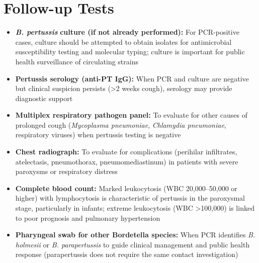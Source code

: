 \section*{Follow-up Tests}
\begin{itemize}
  \item \textit{\textbf{B. pertussis}} \textbf{culture (if not already performed):} For PCR-positive cases, culture should be attempted to obtain isolates for antimicrobial susceptibility testing and molecular typing; culture is important for public health surveillance of circulating strains
  \item \textbf{Pertussis serology (anti-PT IgG):} When PCR and culture are negative but clinical suspicion persists (>2 weeks cough), serology may provide diagnostic support
  \item \textbf{Multiplex respiratory pathogen panel:} To evaluate for other causes of prolonged cough (\textit{Mycoplasma pneumoniae}, \textit{Chlamydia pneumoniae}, respiratory viruses) when pertussis testing is negative
  \item \textbf{Chest radiograph:} To evaluate for complications (perihilar infiltrates, atelectasis, pneumothorax, pneumomediastinum) in patients with severe paroxysms or respiratory distress
  \item \textbf{Complete blood count:} Marked leukocytosis (WBC 20,000--50,000 or higher) with lymphocytosis is characteristic of pertussis in the paroxysmal stage, particularly in infants; extreme leukocytosis (WBC >100,000) is linked to poor prognosis and pulmonary hypertension
  \item \textbf{Pharyngeal swab for other Bordetella species:} When PCR identifies \textit{B. holmesii} or \textit{B. parapertussis} to guide clinical management and public health response (parapertussis does not require the same contact investigation)
\end{itemize}

